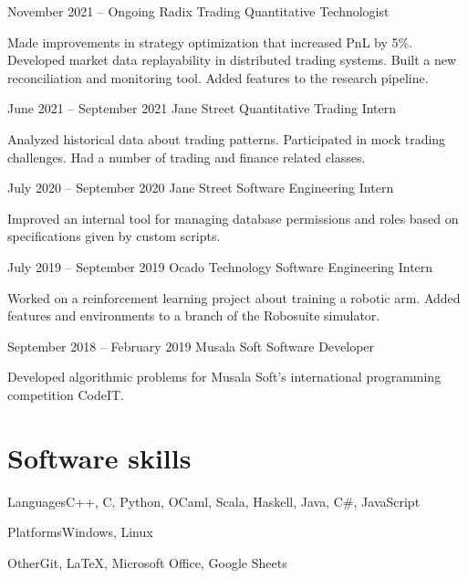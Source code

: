 \documentclass{tccv}
\begin{document}
\begin{eventlist}

\item{November 2021 -- Ongoing}
     {Radix Trading}
     {Quantitative Technologist}

Made improvements in strategy optimization that increased PnL by 5\%.
Developed market data replayability in distributed trading systems.
Built a new reconciliation and monitoring tool.
Added features to the research pipeline.

\item{June 2021 -- September 2021}
     {Jane Street}
     {Quantitative Trading Intern}

Analyzed historical data about trading patterns.
Participated in mock trading challenges.
Had a number of trading and finance related classes. 

\item{July 2020 -- September 2020}
     {Jane Street}
     {Software Engineering Intern}

Improved an internal tool for managing database permissions and roles
based on specifications given by custom scripts.

\item{July 2019 -- September 2019}
     {Ocado Technology}
     {Software Engineering Intern}

Worked on a reinforcement learning project about training a robotic arm.
Added features and environments to a branch of the Robosuite simulator.

\item{September 2018 -- February 2019}
     {Musala Soft}
     {Software Developer}

Developed algorithmic problems for Musala Soft's international programming competition CodeIT.

\end{eventlist}

\section{Software skills}

\begin{factlist}

\item{Languages}{C++, C, Python, OCaml, Scala, Haskell, Java, C\#, JavaScript}
\item{Platforms}{Windows, Linux}
\item{Other}{Git, \LaTeX, Microsoft Office, Google Sheets}

\end{factlist}
\end{document}
